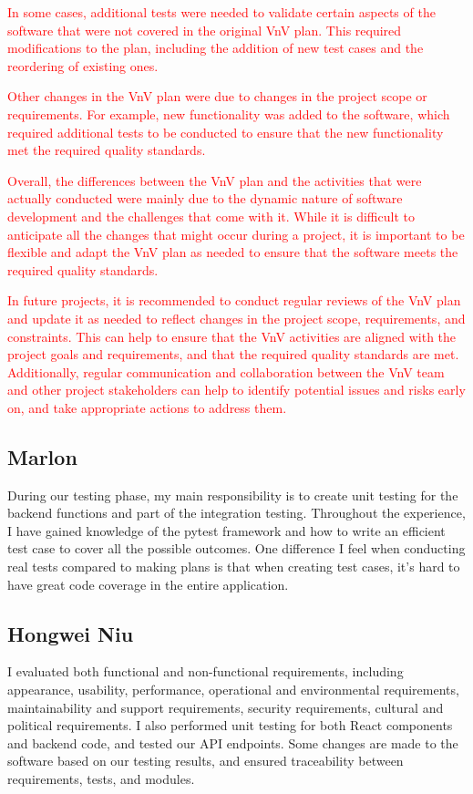 \documentclass[12pt, titlepage]{article}
\begin{document}
\textcolor{red}{In some cases, additional tests were needed to validate certain aspects of the software that were not covered in the original VnV plan. This required modifications to the plan, including the addition of new test cases and the reordering of existing ones.}

\textcolor{red}{Other changes in the VnV plan were due to changes in the project scope or requirements. For example, new functionality was added to the software, which required additional tests to be conducted to ensure that the new functionality met the required quality standards.}

\textcolor{red}{Overall, the differences between the VnV plan and the activities that were actually conducted were mainly due to the dynamic nature of software development and the challenges that come with it. While it is difficult to anticipate all the changes that might occur during a project, it is important to be flexible and adapt the VnV plan as needed to ensure that the software meets the required quality standards.}

\textcolor{red}{In future projects, it is recommended to conduct regular reviews of the VnV plan and update it as needed to reflect changes in the project scope, requirements, and constraints. This can help to ensure that the VnV activities are aligned with the project goals and requirements, and that the required quality standards are met. Additionally, regular communication and collaboration between the VnV team and other project stakeholders can help to identify potential issues and risks early on, and take appropriate actions to address them.}

\subsection{Marlon}
During our testing phase, my main responsibility is to create unit testing for the backend functions and part of the integration testing. Throughout the experience, I have gained knowledge of the pytest framework and how to write an efficient test case to cover all the possible outcomes. One difference I feel when conducting real tests compared to making plans is that when creating test cases, it's hard to have great code coverage in the entire application. 

\subsection{Hongwei Niu}
I evaluated both functional and non-functional requirements, including appearance, usability, performance, operational and environmental requirements, maintainability and support requirements, security requirements, cultural and political requirements. I also performed unit testing for both React components and backend code, and tested our API endpoints. Some changes are made to the software based on our testing results, and ensured traceability between requirements, tests, and modules.
\end{document}
